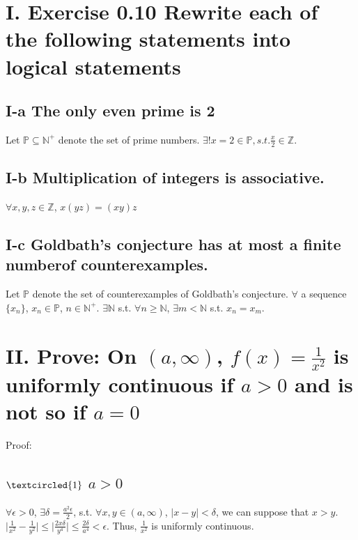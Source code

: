 \documentclass[twoside,a4paper]{article}
\begin{document}
\pagestyle{fancy}
\fancyhead{}


\section*{I. Exercise 0.10 \small{Rewrite each of the following statements into logical statements}}

\subsection*{I-a \small{The only even prime is 2}}
Let $\mathbb{P} \subseteq \mathbb{N}^+$ denote the set of prime numbers. 
$\exists! x = 2 \in \mathbb{P}, s.t. \frac{x}{2} \in \mathbb{Z}.$ 

\subsection*{I-b \small{Multiplication of integers is associative.}}
$\forall x,y,z \in \mathbb{Z}$, $x(yz)=(xy)z$

\subsection*{I-c \small{Goldbath's conjecture has at most a finite numberof counterexamples.}}
Let $\mathbb{P}$ denote the set of counterexamples of Goldbath's conjecture.
$\forall$ a sequence $\{ x_{n} \}$, $x_{n} \in \mathbb{P}$, $n \in \mathbb{N}^+$.
$\exists \mathbb{N}$ s.t. $\forall n \geq \mathbb{N}$, $\exists m < \mathbb{N}$ s.t. $x_{n} = x_{m}$.  

\section*{II. \small{Prove: On $(a, \infty)$, $f(x)=\frac{1}{x^2}$ is uniformly continuous if $a>0$ and is not so if $a=0$  } }
Proof:

\subsection*{\small{$\textcircled{1}$ $a>0$}}
$\forall \epsilon > 0$, $\exists \delta = \frac{a^{2}\epsilon}{2}$, s.t. $\forall x, y \in (a, \infty)$, $\mid x - y \mid < \delta$, we can suppose that $x > y$.
$\mid\frac{1}{x^2} - \frac{1}{y^2}\mid \leq \mid\frac{2x\delta}{y^4}\mid \leq \frac{2\delta}{a^4} < \epsilon$.
Thus, $\frac{1}{x^2}$ is uniformly continuous.
\end{document}
